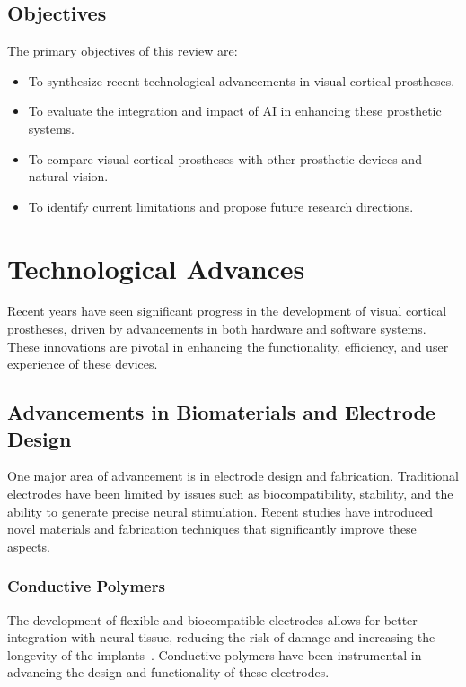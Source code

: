 \documentclass[twocolumn,10pt]{article}
\begin{document}
\subsection{Objectives}\label{sec:objectives}
The primary objectives of this review are:
\begin{itemize}
      \item To synthesize recent technological advancements in visual cortical
            prostheses.
      \item To evaluate the integration and impact of AI in enhancing these
            prosthetic systems.
      \item To compare visual cortical prostheses with other prosthetic devices
            and natural vision.
      \item To identify current limitations and propose future research
            directions.
\end{itemize}

\section{Technological Advances}\label{sec:tech_advances}
Recent years have seen significant progress in the development of visual
cortical prostheses, driven by advancements in both hardware and software
systems. These innovations are pivotal in enhancing the functionality,
efficiency, and user experience of these devices.

\subsection{Advancements in Biomaterials and Electrode Design}
One major area of advancement is in electrode design and fabrication.
Traditional electrodes have been limited by issues such as biocompatibility,
stability, and the ability to generate precise neural stimulation. Recent
studies have introduced novel materials and fabrication techniques that
significantly improve these aspects.

\subsubsection*{Conductive Polymers}
The development of flexible and biocompatible electrodes allows for better
integration with neural tissue, reducing the risk of damage and increasing the
longevity of the implants~\parencite{xiangFlexibleThreedimensionalElectrode2016}.
Conductive polymers have been instrumental in advancing the design and
functionality of these electrodes.
\end{document}
